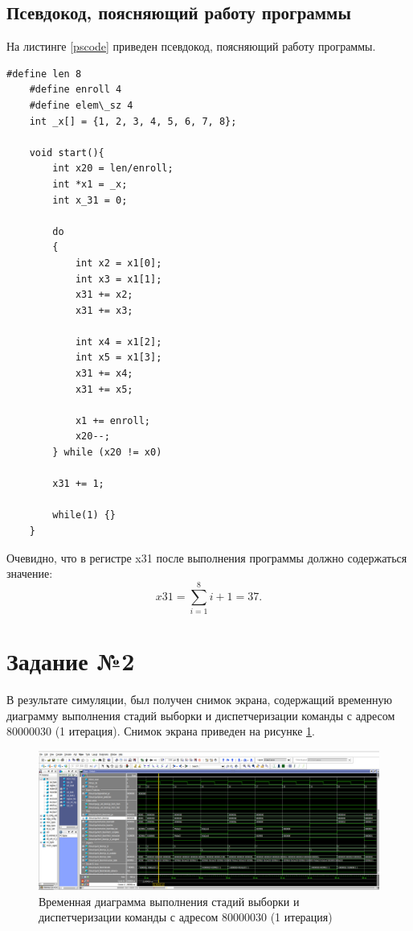 \subsection{Псевдокод, поясняющий работу программы}
На листинге \ref{pscode} приведен псевдокод, поясняющий работу программы.

\begin{lstlisting}[extendedchars=true, keepspaces=true, escapechar=\%, texcl=true, label=pscode,caption=Псевдокод\, поясняющий работу программы]
	#define len 8
	#define enroll 4
	#define elem\_sz 4
	int _x[] = {1, 2, 3, 4, 5, 6, 7, 8};
	
	void start(){
		int x20 = len/enroll;
		int *x1 = _x;
		int x_31 = 0;
		
		do
		{
			int x2 = x1[0];
			int x3 = x1[1];
			x31 += x2;
			x31 += x3;
			
			int x4 = x1[2];
			int x5 = x1[3];
			x31 += x4;
			x31 += x5;
			
			x1 += enroll;
			x20--;
		} while (x20 != x0)
		
		x31 += 1;
		
		while(1) {}
	}
\end{lstlisting}

Очевидно, что в регистре x31 после выполнения программы должно содержаться значение:
\begin{displaymath}
	x31 = \sum\limits_{i=1}^8{i} + 1 = 37.
\end{displaymath}
\newpage

\section{Задание №2}
В результате симуляции, был получен снимок экрана, содержащий временную диаграмму выполнения стадий выборки и диспетчеризации команды с адресом 80000030 (1 итерация). Снимок экрана приведен на рисунке \ref{fetch}.

\begin{figure}[h!p]
	\centering
	\includegraphics[width = \linewidth]{../img/fetch.png}
	\caption{Временная диаграмма выполнения стадий выборки и диспетчеризации команды с адресом 80000030 (1 итерация)}
	\label{fetch}
\end{figure}

